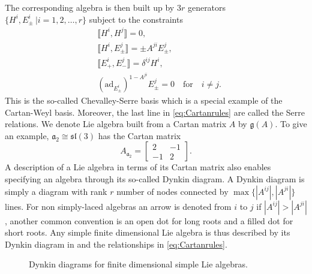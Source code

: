 The corresponding algebra is then built up by $3r$ generators $\{H^i,E_{\pm}^i\ |i=1,2,\ldots,r\}$ subject to the constraints
\begin{equation}
\begin{aligned}\label{eq:Cartanrules}
    &\llbracket H^i,H^j\rrbracket = 0,\\
    &\llbracket H^i,E_{\pm}^j\rrbracket = \pm A^{ji}E_{\pm}^{j},\\
    &\llbracket E_+^i,E_-^j\rrbracket = \delta^{ij}H^i,\\
    &(\text{ad}_{E_{\pm}^i})^{1-A^{ji}}E^j_\pm = 0 \quad \text{for} \quad i\neq j.
\end{aligned}
\end{equation}
This is the so-called Chevalley-Serre basis which is a special example of the Cartan-Weyl basis. Moreover, the last line in \eqref{eq:Cartanrules} are called the Serre relations. We denote Lie algebra built from a Cartan matrix $A$ by $\mathfrak{g}(A)$. To give an example, $\mathfrak{a}_2\cong \mathfrak{sl}(3)$ has the Cartan matrix
\begin{equation}
    A_\mathfrak{a_2}=\begin{bmatrix}2&-1\\-1&2\end{bmatrix}.
\end{equation}
A description of a Lie algebra in terms of its Cartan matrix also enables specifying an algebra through its so-called Dynkin diagram. A Dynkin diagram is simply a diagram with rank $r$ number of nodes connected by $\max\{|A^{ij}|,|A^{ji}|\}$ lines. For non simply-laced algebras an arrow is denoted from $i$ to $j$ if $|A^{ij}|>|A^{ji}|$, another common convention is an open dot for long roots and a filled dot for short roots. Any simple finite dimensional Lie algebra is thus described by its Dynkin diagram in  and the relationships in \eqref{eq:Cartanrules}.
\begin{figure}
    \centering
    \AllDynkin
    \caption{Dynkin diagrams for finite dimensional simple Lie algebras.}
    \label{fig:AllDynkin}
\end{figure}




